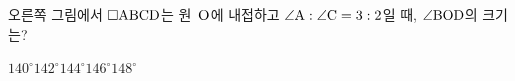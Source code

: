 \noindent\begin{minipage}[t]{0.58\linewidth}\vspace{0pt}\raggedright 오른쪽 그림에서 $\square\mathrm{ABCD}$는 원~$\mathrm{O}$에 내접하고 $\angle\mathrm{A}:\angle\mathrm{C}=3:2$일 때, $\angle\mathrm{BOD}$의 크기는?\end{minipage}\hfill\begin{minipage}[t]{0.4\linewidth}\vspace{0pt}\centering \resizebox{\ifdim\width>\linewidth\linewidth\else\width\fi}{!}{}\end{minipage}\par
\begin{choicesii}{$140^\circ$}{$142^\circ$}{$144^\circ$}{$146^\circ$}{$148^\circ$}\end{choicesii}
